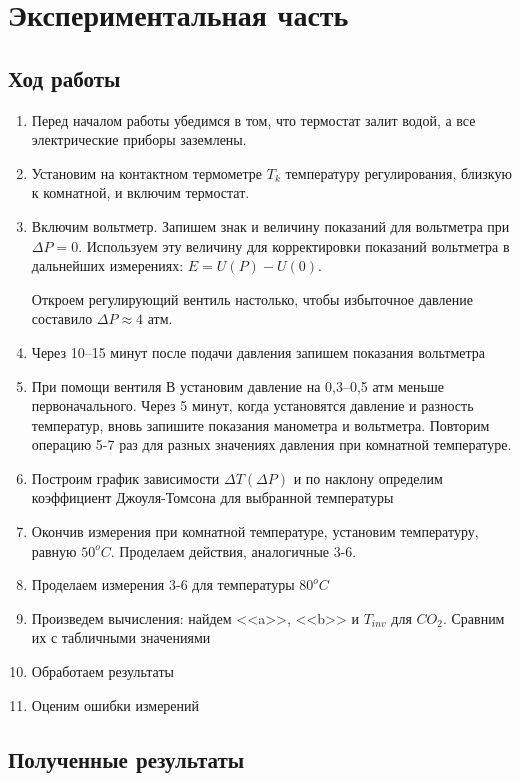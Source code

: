 \documentclass[a4paper,12pt]{article} %
\begin{document}
\section{Экспериментальная часть}
\subsection{Ход работы}
\begin{enumerate} 
\itemsep0em
\item Перед началом работы убедимся в том, что термостат залит водой,
а все электрические приборы заземлены.
\item Установим на контактном термометре $T_k$ температуру регулирования, близкую к комнатной, и включим термостат. 
\item Включим вольтметр. Запишем знак и величину показаний для вольтметра при $\Delta P = 0$. Используем эту величину для корректировки показаний вольтметра в дальнейших измерениях: $E = U(P)-U(0)$.

Откроем регулирующий вентиль настолько, чтобы избыточное давление составило $\Delta P \approx 4$ атм.
\item Через 10–15 минут после подачи давления запишем показания вольтметра
\item При помощи вентиля В установим давление на 0,3–0,5 атм меньше первоначального. Через 5 минут, когда
установятся давление и разность температур, вновь запишите показания манометра и вольтметра. Повторим операцию 5-7 раз для разных значениях давления при комнатной температуре.
\item Построим график зависимости $\Delta T (\Delta P)$ и по наклону определим коэффициент Джоуля-Томсона для выбранной температуры
\item Окончив измерения при комнатной температуре, установим температуру, равную $50 ^oC$. Проделаем действия, аналогичные 3-6. 
\item Проделаем измерения 3-6 для температуры $80 ^oC$
\item Произведем вычисления: найдем <<a>>, <<b>> и $T_{inv}$ для $CO_2$. Сравним их с табличными значениями
\item Обработаем результаты
\item Оценим ошибки измерений 

\end{enumerate}
\subsection{Полученные результаты}
\paragraph{}
\end{document}
